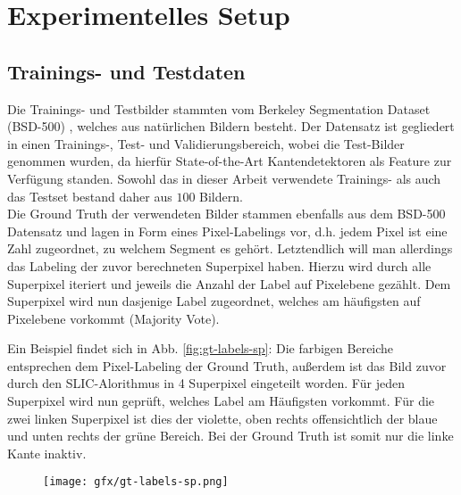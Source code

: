 \chapter{Experimentelles Setup}\label{ch:mathtest} %

\section{Trainings- und Testdaten}


Die Trainings- und Testbilder stammten vom Berkeley Segmentation Dataset (BSD-500) \cite{BSD}, welches aus natürlichen Bildern besteht. Der Datensatz ist gegliedert in einen Trainings-, Test- und Validierungsbereich, wobei die Test-Bilder genommen wurden, da hierfür State-of-the-Art Kantendetektoren als Feature zur Verfügung standen. Sowohl das in dieser Arbeit verwendete Trainings- als auch das Testset bestand daher aus $100$ Bildern. \\

Die Ground Truth der verwendeten Bilder stammen ebenfalls aus dem BSD-500 Datensatz und lagen in Form eines Pixel-Labelings vor, d.h. jedem Pixel ist eine Zahl zugeordnet, zu welchem Segment es gehört. Letztendlich will man allerdings das Labeling der zuvor berechneten Superpixel haben. Hierzu wird durch alle Superpixel iteriert und jeweils die Anzahl der Label auf Pixelebene gezählt. Dem Superpixel wird nun dasjenige Label zugeordnet, welches am häufigsten auf Pixelebene vorkommt (Majority Vote). 

Ein Beispiel findet sich in Abb. \ref{fig:gt-labels-sp}: Die farbigen Bereiche entsprechen dem Pixel-Labeling der Ground Truth, außerdem ist das Bild zuvor durch den SLIC-Alorithmus in 4 Superpixel eingeteilt worden. Für jeden Superpixel wird nun geprüft, welches Label am Häufigsten vorkommt. Für die zwei linken Superpixel ist dies der violette, oben rechts offensichtlich der blaue und unten rechts der grüne Bereich. Bei der Ground Truth ist somit nur die linke Kante inaktiv. 

\vspace{1cm}

\begin{figure}[H]
	\centering
	\texttt{[image: gfx/gt-labels-sp.png]}
\end{figure}
\label{fig:gt-labels-sp}
\vspace{1cm}

